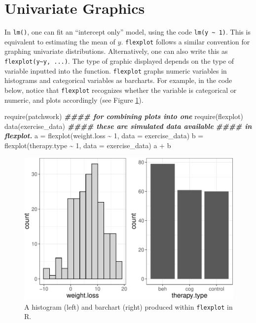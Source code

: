 \documentclass[
  english,
  man]{apa6}
\newenvironment{Shaded}{\begin{snugshade}}{\end{snugshade}}
\newcommand{\AttributeTok}[1]{\textcolor[rgb]{0.77,0.63,0.00}{#1}}
\newcommand{\DecValTok}[1]{\textcolor[rgb]{0.00,0.00,0.81}{#1}}
\newcommand{\DocumentationTok}[1]{\textcolor[rgb]{0.56,0.35,0.01}{\textbf{\textit{#1}}}}
\newcommand{\FunctionTok}[1]{\textcolor[rgb]{0.00,0.00,0.00}{#1}}
\newcommand{\NormalTok}[1]{#1}
\newcommand{\OtherTok}[1]{\textcolor[rgb]{0.56,0.35,0.01}{#1}}
\newcommand{\SpecialCharTok}[1]{\textcolor[rgb]{0.00,0.00,0.00}{#1}}
\begin{document}
\hypertarget{univariate-graphics}{%
\section{Univariate Graphics}\label{univariate-graphics}}

In \texttt{lm()}, one can fit an ``intercept only'' model, using the code \texttt{lm(y\ \textasciitilde{}\ 1)}. This is equivalent to estimating the mean of \(y\). \texttt{flexplot} follows a similar convention for graphing univariate distributions. Alternatively, one can also write this as \texttt{flexplot(y\textasciitilde{}y,\ ...)}. The type of graphic displayed depends on the type of variable inputted into the function. \texttt{flexplot} graphs numeric variables in histograms and categorical variables as barcharts. For example, in the code below, notice that \texttt{flexplot} recognizes whether the variable is categorical or numeric, and plots accordingly (see Figure \ref{fig:bar}).

\small

\begin{Shaded}
\begin{Highlighting}[]
\FunctionTok{require}\NormalTok{(patchwork) }\DocumentationTok{\#\#\#\# for combining plots into one}
\FunctionTok{require}\NormalTok{(flexplot)}
\FunctionTok{data}\NormalTok{(exercise\_data) }\DocumentationTok{\#\#\#\# these are simulated data available }
                    \DocumentationTok{\#\#\#\# in flexplot. }
\NormalTok{a }\OtherTok{=} \FunctionTok{flexplot}\NormalTok{(weight.loss }\SpecialCharTok{\textasciitilde{}} \DecValTok{1}\NormalTok{, }\AttributeTok{data =}\NormalTok{ exercise\_data)}
\NormalTok{b }\OtherTok{=} \FunctionTok{flexplot}\NormalTok{(therapy.type }\SpecialCharTok{\textasciitilde{}} \DecValTok{1}\NormalTok{, }\AttributeTok{data =}\NormalTok{ exercise\_data)}
\NormalTok{a }\SpecialCharTok{+}\NormalTok{ b}
\end{Highlighting}
\end{Shaded}

\begin{figure}
\centering
\includegraphics{flexplot_psychmeth_files/figure-latex/bar-1.pdf}
\caption{\label{fig:bar}A histogram (left) and barchart (right) produced within \texttt{flexplot} in R.}
\end{figure}
\end{document}
